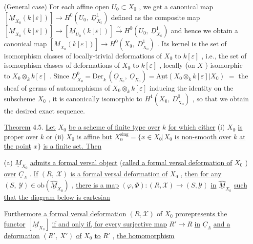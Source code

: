 (General case)  For each affine open  $U_{0} \subset X_{0}$ , we get a canonical map $[\underline{M}_{X_{0}}(k[\varepsilon])] \to H^{0}(U_{0},\ \underline{D}^{1}_{X_{0}})$  defined as the composite map $[\underline{M}_{X_{0}}(k[\varepsilon])] \to [\underline{M}_{U_{0}}(k[\varepsilon])] \overset{\sim}{\longrightarrow} H^{0}(U_{0},\ \underline{D}^{1}_{X_{0}})$  and hence we obtain a canonical map $[\underline{M}_{X_{0}}(k[\varepsilon])] \to H^{0}(X_{0},\ \underline{D}^{1}_{X_{0}})$ . Its kernel is the set of isomorphism classes of locally-trivial deformations of  $X_{0}$  to  $k[\varepsilon]$ , i.e., the set of isomorphism classes of deformations of  $X_{0}$  to  $k[\varepsilon]$ , locally (on $X$ ) isomorphic to $X_{0} \otimes_{k} k[\varepsilon]$ . Since  $\underline{D}^{0}_{X_{0}} = \underline{\mathrm{Der}}_{k}\,(\underline{O}_{X_{0}},\ \underline{O}_{X_{0}}) = \underline{\mathrm{Aut}}(X_{0} \otimes_{k} k[\varepsilon]|X_{0})$  $=$ the sheaf of germs of automorphisms of  $X_{0} \otimes_{k} k[\varepsilon]$  inducing the identity on the subscheme $X_{0}$ , it is canonically isomorphic to  $H^{1}(X_{0},\ \underline{D}^{0}_{X_{0}})$ , so that we obtain the desired exact sequence.

\underline{Theorem} 4.5.  \underline{Let} $X_{0}$ \underline{be a scheme of finite type over} $k$ \underline{for which either} (i) $X_{0}$ \underline{is proper over} $k$ \underline{or} (ii) $X_{0}$ \underline{is affine but} $X_{0}^{\mathrm{sing}} = \{x \in X_{0}|X_{0}$ \underline{is non-smooth over} $k$ \underline{at the point} $x \}$ \underline{is a finite set. Then}

(a)  $\underline{M}_{X_{0}}$  \underline{admits a formal versal object} (\underline{called a formal versal deformation of}  $X_{0}$ ) \underline{over}  $\underline{C}_{\Lambda}$ . \underline{If}  $(R,\ \mathcal{X})$  \underline{is a formal versal deformation of}  $X_{0}$ , \underline{then for any} $(S,\ \mathcal{Y}) \in \mathrm{ob}(\widehat{\underline{M}}_{X_{0}})$ , \underline{there is a map}  $(\varphi,\Phi) : (R,\mathcal{X}) \to (S,\mathcal{Y})$  \underline{in}  $\widehat{\underline{M}}_{X_{0}}$  \underline{such that the diagram below is cartesian}

\begin{center}
\end{center}
\underline{Furthermore a formal versal deformation}  $(R,\mathcal{X})$  of  $X_{0}$  \underline{prorepresents the functor} $[\underline{M}_{X_{0}}]$  \underline{if and only if, for every surjective map}  $R' \to R$  \underline{in}  $\underline{C}_{\Lambda}$  \underline{and a deformation} $(R',\ X')$  \underline{of}  $X_{0}$  \underline{to}  $R'$ , \underline{the homomorphism}

